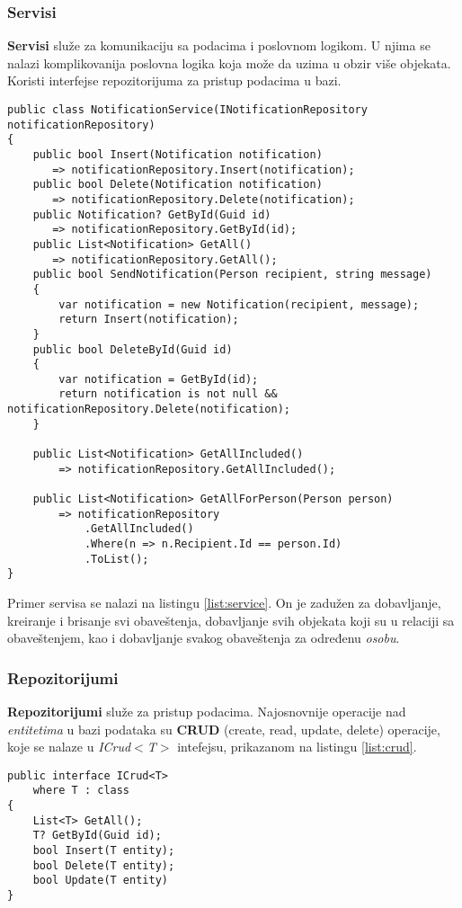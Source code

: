 \subsubsection*{Servisi}
\par \textbf{Servisi} služe za komunikaciju sa podacima i poslovnom logikom. U njima se nalazi komplikovanija poslovna logika koja može da uzima u obzir više objekata.
Koristi interfejse repozitorijuma za pristup podacima u bazi. 
\begin{lstlisting}[caption={Primer servisa}, captionpos=b, label=list:service]
public class NotificationService(INotificationRepository notificationRepository)
{
    public bool Insert(Notification notification) 
       => notificationRepository.Insert(notification);
    public bool Delete(Notification notification) 
       => notificationRepository.Delete(notification);
    public Notification? GetById(Guid id) 
       => notificationRepository.GetById(id);
    public List<Notification> GetAll() 
       => notificationRepository.GetAll();
    public bool SendNotification(Person recipient, string message)
    {
        var notification = new Notification(recipient, message);
        return Insert(notification);
    }
    public bool DeleteById(Guid id)
    {
        var notification = GetById(id);
        return notification is not null && notificationRepository.Delete(notification);
    }

    public List<Notification> GetAllIncluded()
        => notificationRepository.GetAllIncluded();

    public List<Notification> GetAllForPerson(Person person)
        => notificationRepository
            .GetAllIncluded()
            .Where(n => n.Recipient.Id == person.Id)
            .ToList();
}
\end{lstlisting}
\par Primer servisa se nalazi na listingu \ref{list:service}. On je zadužen za dobavljanje, kreiranje i brisanje svi obaveštenja, dobavljanje svih objekata
koji su u relaciji sa obaveštenjem, kao i dobavljanje svakog obaveštenja za određenu \textit{osobu}.
\subsubsection*{Repozitorijumi}
\par \textbf{Repozitorijumi} služe za pristup podacima. Najosnovnije operacije nad \textit{entitetima} u bazi podataka su \textbf{CRUD} (create, read, update, delete) 
operacije, koje se nalaze u \textit{ICrud$<$T$>$} intefejsu, prikazanom na listingu \ref{list:crud}.
\begin{lstlisting}[caption={ICrud$<$T$>$ interfejs}, captionpos=b, label={list:crud}]
public interface ICrud<T> 
    where T : class
{
    List<T> GetAll();
    T? GetById(Guid id);
    bool Insert(T entity);
    bool Delete(T entity);
    bool Update(T entity)
}
\end{lstlisting}
